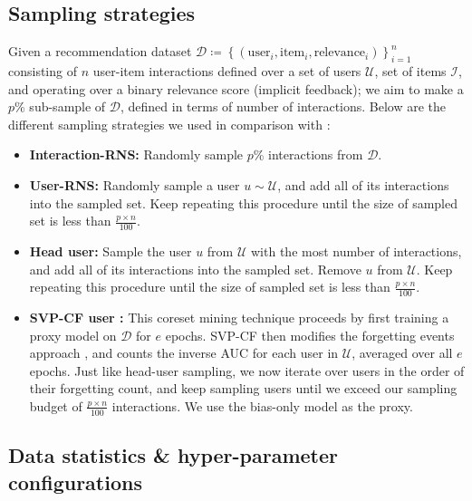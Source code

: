 \documentclass{article}
\begin{document}
\subsection{Sampling strategies} \label{appendix:samplers}

Given a recommendation dataset $\mathcal{D} \coloneqq \left\{ (\text{user}_i, \text{item}_i, \text{relevance}_i) \right\}_{i=1}^{n}$ consisting of $n$ user-item interactions defined over a set of users $\mathcal{U}$, set of items $\mathcal{I}$, and operating over a binary relevance score (implicit feedback); we aim to make a $p$\% sub-sample of $\mathcal{D}$, defined in terms of number of interactions. Below are the different sampling strategies we used in comparison with \sampler:

\begin{itemize}[leftmargin=.3in]
    \item \textbf{Interaction-RNS:} Randomly sample $p$\% interactions from $\mathcal{D}$.
    
    \item \textbf{User-RNS:} Randomly sample a user $u \sim \mathcal{U}$, and add all of its interactions into the sampled set. Keep repeating this procedure until the size of sampled set is less than $\frac{p \times n}{100}$.
    
    \item \textbf{Head user:} Sample the user $u$ from $\mathcal{U}$ with the most number of interactions, and add all of its interactions into the sampled set. Remove $u$ from $\mathcal{U}$. Keep repeating this procedure until the size of sampled set is less than $\frac{p \times n}{100}$.
    
    \item \textbf{SVP-CF user \cite{wsdm22}:} This coreset mining technique proceeds by first training a proxy model on $\mathcal{D}$ for $e$ epochs. SVP-CF then modifies the forgetting events approach \cite{forgetting_events}, and counts the inverse AUC for each user in $\mathcal{U}$, averaged over all $e$ epochs. Just like head-user sampling, we now iterate over users in the order of their forgetting count, and keep sampling users until we exceed our sampling budget of $\frac{p \times n}{100}$ interactions. We use the bias-only model as the proxy.
\end{itemize}

\subsection{Data statistics \& hyper-parameter configurations} \label{appendix:hyper_params}
\end{document}
